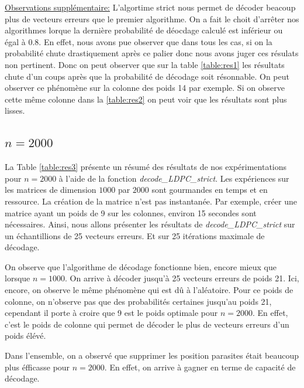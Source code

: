 \documentclass[french,nochapter,11pt]{rapportUB}
\begin{document}
\underline{Observations supplémentaire:} L'algortime strict nous permet de décoder beacoup plus de vecteurs erreurs que le premier algorithme. On a fait le choit d'arrêter nos algorithmes
lorque la dernière probabilité de déocdage calculé est inférieur ou égal à 0.8. En effet, nous avons pue observer que dans tous les cas, si on la probabilité chute drastiquement
après ce palier donc nous avons juger ces résulats non pertinent. Donc on peut observer que sur la table \ref{table:res1} les résultats chute d'un coups après que la probabilité de décodage soit 
résonnable. On peut observer ce phénomène sur la colonne des poids 14 par exemple. Si on observe cette même colonne dans la \ref{table:res2} on peut voir que les résultats sont plus lisses.

\subsection{$n = 2000$}
La Table \ref{table:res3} présente un résumé des résultats de nos expérimentations pour $n=2000$ à l'aide de la fonction
\textit{decode\_LDPC\_strict}.\vspace{0.4cm}\newline
Les expériences sur les matrices de dimension $1000$ par $2000$ sont gourmandes en temps et en ressource. La création de la matrice n'est pas instantanée. Par exemple, créer une matrice ayant un poids de 9 sur les colonnes, environ 15 secondes sont nécessaires. 
Ainsi, nous allons présenter 
les résultats de \textit{decode\_LDPC\_strict} sur un échantillions de 25 vecteurs erreurs. Et sur 25 itérations maximale de décodage.\vspace{0.4cm}\newline

On observe que l'algorithme de décodage fonctionne bien, encore mieux que lorsque $n=1000$. On arrive à décoder jusqu'à 25 vecteurs erreurs de poids 21. Ici, encore, on observe le même phénomène qui est 
dû à l'aléatoire. Pour ce poids de colonne, on n'observe pas que des probabilités certaines jusqu'au poids 21, cependant il porte à croire que 9 est le poids optimale pour 
$n = 2000$. En effet, c'est le poids de colonne qui permet de décoder le plus de vecteurs erreurs d'un poids élévé.\vspace{0.4cm}\newline


Dans l'ensemble, on a observé que supprimer les position parasites était beaucoup plus éfficasse pour $n=2000$. En effet, on arrive à gagner en terme de capacité de décodage.
\end{document}
